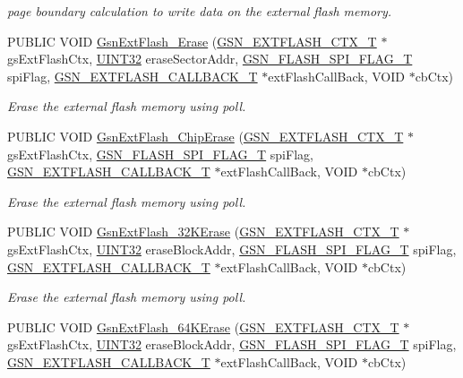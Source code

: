 \begin{DoxyCompactItemize}
\begin{DoxyCompactList}\small\item\em page boundary calculation to write data on the external flash memory. \end{DoxyCompactList}\item 
PUBLIC VOID \hyperlink{a00664_ga8f346bfff1d200c13547335c5e15ee21}{GsnExtFlash\_\-Erase} (\hyperlink{a00071}{GSN\_\-EXTFLASH\_\-CTX\_\-T} $\ast$gsExtFlashCtx, \hyperlink{a00660_gae1e6edbbc26d6fbc71a90190d0266018}{UINT32} eraseSectorAddr, \hyperlink{a00496_ae69f658e2fd080c54a78eb23e4be2f59}{GSN\_\-FLASH\_\-SPI\_\-FLAG\_\-T} spiFlag, \hyperlink{a00496_a501e29be4c0f8b2ab5c186eb8deb8874}{GSN\_\-EXTFLASH\_\-CALLBACK\_\-T} $\ast$extFlashCallBack, VOID $\ast$cbCtx)
\begin{DoxyCompactList}\small\item\em Erase the external flash memory using poll. \end{DoxyCompactList}\item 
PUBLIC VOID \hyperlink{a00664_gafe4645cffc8fea4258121afb22b7710a}{GsnExtFlash\_\-ChipErase} (\hyperlink{a00071}{GSN\_\-EXTFLASH\_\-CTX\_\-T} $\ast$gsExtFlashCtx, \hyperlink{a00496_ae69f658e2fd080c54a78eb23e4be2f59}{GSN\_\-FLASH\_\-SPI\_\-FLAG\_\-T} spiFlag, \hyperlink{a00496_a501e29be4c0f8b2ab5c186eb8deb8874}{GSN\_\-EXTFLASH\_\-CALLBACK\_\-T} $\ast$extFlashCallBack, VOID $\ast$cbCtx)
\begin{DoxyCompactList}\small\item\em Erase the external flash memory using poll. \end{DoxyCompactList}\item 
PUBLIC VOID \hyperlink{a00664_gac7cc4c60e6c57cc8516f0657f294e9f8}{GsnExtFlash\_\-32KErase} (\hyperlink{a00071}{GSN\_\-EXTFLASH\_\-CTX\_\-T} $\ast$gsExtFlashCtx, \hyperlink{a00660_gae1e6edbbc26d6fbc71a90190d0266018}{UINT32} eraseBlockAddr, \hyperlink{a00496_ae69f658e2fd080c54a78eb23e4be2f59}{GSN\_\-FLASH\_\-SPI\_\-FLAG\_\-T} spiFlag, \hyperlink{a00496_a501e29be4c0f8b2ab5c186eb8deb8874}{GSN\_\-EXTFLASH\_\-CALLBACK\_\-T} $\ast$extFlashCallBack, VOID $\ast$cbCtx)
\begin{DoxyCompactList}\small\item\em Erase the external flash memory using poll. \end{DoxyCompactList}\item 
PUBLIC VOID \hyperlink{a00664_ga62708c304046ad8a906a0152cc3487ba}{GsnExtFlash\_\-64KErase} (\hyperlink{a00071}{GSN\_\-EXTFLASH\_\-CTX\_\-T} $\ast$gsExtFlashCtx, \hyperlink{a00660_gae1e6edbbc26d6fbc71a90190d0266018}{UINT32} eraseBlockAddr, \hyperlink{a00496_ae69f658e2fd080c54a78eb23e4be2f59}{GSN\_\-FLASH\_\-SPI\_\-FLAG\_\-T} spiFlag, \hyperlink{a00496_a501e29be4c0f8b2ab5c186eb8deb8874}{GSN\_\-EXTFLASH\_\-CALLBACK\_\-T} $\ast$extFlashCallBack, VOID $\ast$cbCtx)

\end{DoxyCompactItemize}

